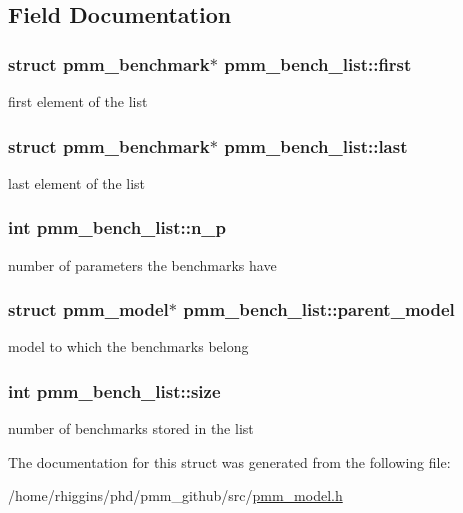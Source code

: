 \subsection{Field Documentation}
\hypertarget{structpmm__bench__list_a63421cdb338bd9338f4cab9c3ed77fc3}{
\subsubsection[{first}]{\setlength{\rightskip}{0pt plus 5cm}struct {\bf pmm\-\_\-benchmark}$\ast$ pmm\-\_\-bench\-\_\-list\-::first}}\label{structpmm__bench__list_a63421cdb338bd9338f4cab9c3ed77fc3}
first element of the list \hypertarget{structpmm__bench__list_a0ef262381d4de06ad02c939a86580c06}{
\subsubsection[{last}]{\setlength{\rightskip}{0pt plus 5cm}struct {\bf pmm\-\_\-benchmark}$\ast$ pmm\-\_\-bench\-\_\-list\-::last}}\label{structpmm__bench__list_a0ef262381d4de06ad02c939a86580c06}
last element of the list \hypertarget{structpmm__bench__list_acacb1e1d72f7a09dfb9ce27a004c4102}{
\subsubsection[{n\-\_\-p}]{\setlength{\rightskip}{0pt plus 5cm}int pmm\-\_\-bench\-\_\-list\-::n\-\_\-p}}\label{structpmm__bench__list_acacb1e1d72f7a09dfb9ce27a004c4102}
number of parameters the benchmarks have \hypertarget{structpmm__bench__list_a597ed45b5cb3c41c5e86669ebaceca8a}{
\subsubsection[{parent\-\_\-model}]{\setlength{\rightskip}{0pt plus 5cm}struct {\bf pmm\-\_\-model}$\ast$ pmm\-\_\-bench\-\_\-list\-::parent\-\_\-model}}\label{structpmm__bench__list_a597ed45b5cb3c41c5e86669ebaceca8a}
model to which the benchmarks belong \hypertarget{structpmm__bench__list_ad7b85549cd25a24eebbd006550000a80}{
\subsubsection[{size}]{\setlength{\rightskip}{0pt plus 5cm}int pmm\-\_\-bench\-\_\-list\-::size}}\label{structpmm__bench__list_ad7b85549cd25a24eebbd006550000a80}
number of benchmarks stored in the list 

The documentation for this struct was generated from the following file\-:\begin{DoxyCompactItemize}
\item 
/home/rhiggins/phd/pmm\-\_\-github/src/\hyperlink{pmm__model_8h}{pmm\-\_\-model.\-h}\end{DoxyCompactItemize}
